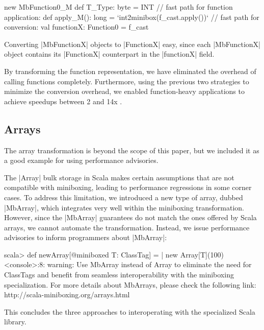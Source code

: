\begin{lstlisting-nobreak}
   new MbFunction0_M {
     def T_Type: byte = INT
     // fast path for function application:
     def apply_M(): long = `int2minibox(f_cast.apply())`
     // fast path for conversion:
     val functionX: Function0 = f_cast
   }
\end{lstlisting-nobreak}

Converting |MbFunctionX| objects to |FunctionX| easy, since each |MbFunctionX| object contains its |FunctionX| counterpart in the |functionX| field.

By transforming the function representation, we have eliminated the overhead of calling functions completely. Furthermore, using the previous two strategies to minimize the conversion overhead, we enabled function-heavy applications to achieve speedups between 2 and 14x \cite{ildl-tech, ildl-plugin-wiki}. 

\subsection{Arrays}
\label{sec:mbarrays}

The array transformation \cite{romain-mbarrays} is beyond the scope of this paper, but we included it as a good example for using performance advisories.

The |Array| bulk storage in Scala makes certain assumptions that are not compatible with miniboxing, leading to performance regressions in some corner cases. To address this limitation, we introduced a new type of array, dubbed |MbArray|, which integrates very well within the miniboxing transformation. However, since the |MbArray| guarantees do not match the ones offered by Scala arrays, we cannot automate the transformation. Instead, we issue performance advisories to inform programmers about |MbArray|:

\begin{lstlisting-nobreak-nolang}
scala> def newArray[@miniboxed T: ClassTag] =
       |   new Array[T](100)
<console>:8: warning: Use MbArray instead of Array to eliminate the need for ClassTags and benefit from seamless interoperability with the miniboxing specialization. For more details about MbArrays, please check the following link: http://scala-miniboxing.org/arrays.html
\end{lstlisting-nobreak-nolang}

This concludes the three approaches to interoperating with the specialized Scala library.